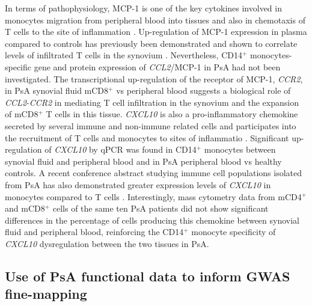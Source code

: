 In terms of pathophysiology, MCP-1 is one of the key cytokines involved in monocytes migration from peripheral blood into tissues and also in chemotaxis of T cells to the site of inflammation \parencite{Tsou2007,Shadidi2003}. Up-regulation of MCP-1 expression in plasma compared to controls has previously been demonstrated and shown to correlate levels of infiltrated T cells in the synovium \parencite{Ross2000}. Nevertheless, CD14$^+$ monocytes-specific gene and protein expression of \textit{CCL2}/MCP-1 in PsA had not been investigated. The transcriptional up-regulation of the receptor of MCP-1, \textit{CCR2}, in PsA synovial fluid mCD8$^+$ vs peripheral blood suggests a biological role of \textit{CCL2}-\textit{CCR2} in mediating T cell infiltration in the synovium and the expansion of mCD8$^+$ T cells in this tissue. %
\textit{CXCL10} is also a pro-inflammatory chemokine secreted by several immune and non-immune related cells and participates into the recruitment of T cells and monocytes to sites of inflammatio \parencite{Antonelli2014}. Significant up-regulation of \textit{CXCL10} by qPCR was found in CD14$^+$ monocytes between synovial fluid and peripheral blood and in PsA peripheral blood vs healthy controls. A recent conference abstract studying immune cell populations isolated from PsA has also demonstrated greater expression levels of \textit{CXCL10} in monocytes compared to T cells \parencite{Muntyanu2017}. Interestingly, mass cytometry data from mCD4$^+$ and mCD8$^+$ cells of the same ten PsA patients did not show significant differences in the percentage of cells producing this chemokine between synovial fluid and peripheral blood, reinforcing the CD14$^+$ monocyte specificity of \textit{CXCL10} dysregulation between the two tissues in PsA.  %




\subsection{Use of PsA functional data to inform GWAS fine-mapping}

